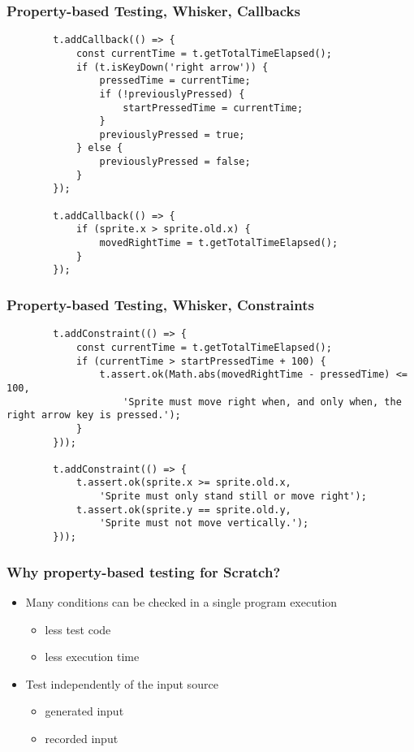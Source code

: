 \begin{frame}[fragile]\frametitle{Property-based Testing, Whisker, Callbacks}
    \begin{verbatim}
        t.addCallback(() => {
            const currentTime = t.getTotalTimeElapsed();
            if (t.isKeyDown('right arrow')) {
                pressedTime = currentTime;
                if (!previouslyPressed) {
                    startPressedTime = currentTime;
                }
                previouslyPressed = true;
            } else {
                previouslyPressed = false;
            }
        });

        t.addCallback(() => {
            if (sprite.x > sprite.old.x) {
                movedRightTime = t.getTotalTimeElapsed();
            }
        });
    \end{verbatim}
\end{frame}

\begin{frame}[fragile]\frametitle{Property-based Testing, Whisker, Constraints}
    \begin{verbatim}
        t.addConstraint(() => {
            const currentTime = t.getTotalTimeElapsed();
            if (currentTime > startPressedTime + 100) {
                t.assert.ok(Math.abs(movedRightTime - pressedTime) <= 100,
                    'Sprite must move right when, and only when, the right arrow key is pressed.');
            }
        }));

        t.addConstraint(() => {
            t.assert.ok(sprite.x >= sprite.old.x,
                'Sprite must only stand still or move right');
            t.assert.ok(sprite.y == sprite.old.y,
                'Sprite must not move vertically.');
        }));
    \end{verbatim}
\end{frame}

\begin{frame}
\end{frame}

\begin{frame}\frametitle{Why property-based testing for Scratch?}
    \begin{itemize}
        \item Many conditions can be checked in a single program execution%
            \begin{itemize}
                \item less test code
                \item less execution time
            \end{itemize}
        \item Test independently of the input source
            \begin{itemize}
                \item generated input
                \item recorded input
            \end{itemize}
    \end{itemize}
\end{frame}

